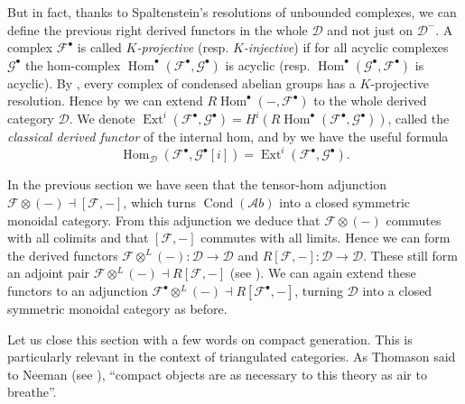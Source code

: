 \documentclass[11pt,A4]{article}
\theoremstyle{plain}
\theoremstyle{definition}
\theoremstyle{remark}
\newcommand{\1}{\mathbbm{1}}
\newcommand{\F}{\mathcal{F}}
\newcommand{\G}{\mathcal{G}}
\newcommand{\Ab}{\mathscr{A}b}
\newcommand{\D}{\mathscr{D}}
\DeclareMathOperator{\Hom}{Hom}
\DeclareMathOperator{\Ext}{Ext}
\DeclareMathOperator{\Cond}{Cond}
\newcommand{\ot}{\otimes}
\newcommand{\grd}{^{\bullet}}
\begin{document}
But in fact, thanks to Spaltenstein's resolutions of unbounded complexes, we can define the previous right derived functors in the whole $\D$ and not just on $\D^{-}$.
A complex $\F\grd$ is called \textit{$K$-projective} (resp. \textit{$K$-injective}) if for all acyclic complexes $\G\grd$ the hom-complex $\Hom\grd(\F\grd,\G\grd)$ is acyclic (resp. $\Hom\grd(\G\grd,\F\grd)$ is acyclic).
By \cite[Corollary 3.5]{spa88}, every complex of condensed abelian groups has a $K$-projective resolution.
Hence by \cite[\href{https://stacks.math.columbia.edu/tag/06XN}{Tag 06XN}]{sta19} we can extend $R\Hom\grd(-,\F\grd)$ to the whole derived category $\D$.
We denote $\Ext^{i}(\F\grd,\G\grd)=H^{i}(R\Hom\grd(\F\grd,\G\grd))$, called the \textit{classical derived functor} of the internal hom, and by \cite[Proposition 1.4]{spa88} we have the useful formula
\[ \Hom_{\D}(\F\grd,\G\grd[i])=\Ext^{i}(\F\grd,\G\grd).\]

In the previous section we have seen that the tensor-hom adjunction $\F\ot (-)\dashv [\F,-]$, which turns $\Cond(\Ab)$ into a closed symmetric monoidal category.
From this adjunction we deduce that $\F\ot (-)$ commutes with all colimits and that $[\F,-]$ commutes with all limits.
Hence we can form the derived functors $\F\ot^{L}(-)\colon \D\to \D$ and $R[\F,-]\colon \D\to \D$.
These still form an adjoint pair $\F\ot^{L}(-)\dashv R[\F,-]$ (see \cite[\href{https://stacks.math.columbia.edu/tag/09T5}{Tag 09T5}]{sta19}).
We can again extend these functors to an adjunction $\F\grd\ot^{L}(-)\dashv R[\F\grd,-]$, turning $\D$ into a closed symmetric monoidal category as before.

Let us close this section with a few words on compact generation.
This is particularly relevant in the context of triangulated categories.
As Thomason said to Neeman (see \cite{nee01}), ``compact objects are as necessary to this theory as air to breathe''.
\end{document}
